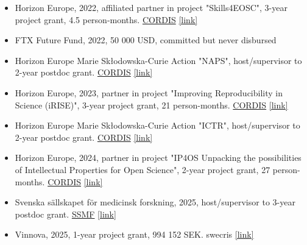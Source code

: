 \documentclass[10pt,a4paper,twocolumn]{article}
\begin{document}
\begin{itemize}
    \item Horizon Europe, 2022, affiliated partner in project "Skills4EOSC", 3-year project grant, 4.5 person-months. \href{https://CORDIS}{CORDIS} \href{https://cordis.europa.eu/project/id/101058527}{[link]}

    \item FTX Future Fund, 2022, 50 000 USD, committed but never disbursed

    \item Horizon Europe Marie Skłodowska-Curie Action "NAPS", host/supervisor to 2-year postdoc grant. \href{https://CORDIS}{CORDIS} \href{https://cordis.europa.eu/project/id/101111182}{[link]}

    \item Horizon Europe, 2023, partner in project "Improving Reproducibility in Science (iRISE)", 3-year project grant, 21 person-months. \href{https://CORDIS}{CORDIS} \href{https://cordis.europa.eu/project/id/101094853}{[link]}

    \item Horizon Europe Marie Skłodowska-Curie Action "ICTR", host/supervisor to 2-year postdoc grant. \href{https://CORDIS}{CORDIS} \href{https://cordis.europa.eu/project/id/101152904}{[link]}

    \item Horizon Europe, 2024, partner in project "IP4OS Unpacking the possibilities of Intellectual Properties for Open Science", 2-year project grant, 27 person-months. \href{https://CORDIS}{CORDIS} \href{https://cordis.europa.eu/project/id/101188026}{[link]}

    \item Svenska sällskapet för medicinsk forskning, 2025, host/supervisor to 3-year postdoc grant. \href{https://SSMF}{SSMF} \href{https://www.ssmf.se/forskare/oreste-affatato/}{[link]}

    \item Vinnova, 2025, 1-year project grant, 994 152 SEK. swecris \href{https://www.vr.se/english/swecris.html#/project/2025-00509_Vinnova}{[link]}

\end{itemize}


\end{document}
